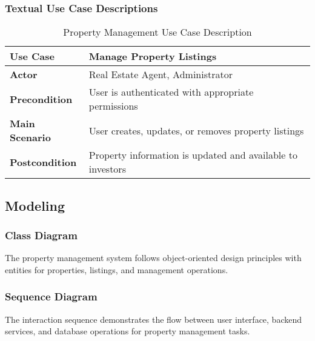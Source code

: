 \subsubsection{Textual Use Case Descriptions}

\begin{table}[htbp]
    \centering
    \begin{tabular}{|p{3cm}|p{10cm}|}
        \hline
        \textbf{Use Case} & \textbf{Manage Property Listings} \\
        \hline
        \textbf{Actor} & Real Estate Agent, Administrator \\
        \hline
        \textbf{Precondition} & User is authenticated with appropriate permissions \\
        \hline
        \textbf{Main Scenario} & User creates, updates, or removes property listings \\
        \hline
        \textbf{Postcondition} & Property information is updated and available to investors \\
        \hline
    \end{tabular}
    \caption{Property Management Use Case Description}
    \label{tab:property-management-use-case}
\end{table}

\subsection{Modeling}
\subsubsection{Class Diagram}
The property management system follows object-oriented design principles with entities for properties, listings, and management operations.


\subsubsection{Sequence Diagram}
The interaction sequence demonstrates the flow between user interface, backend services, and database operations for property management tasks.

